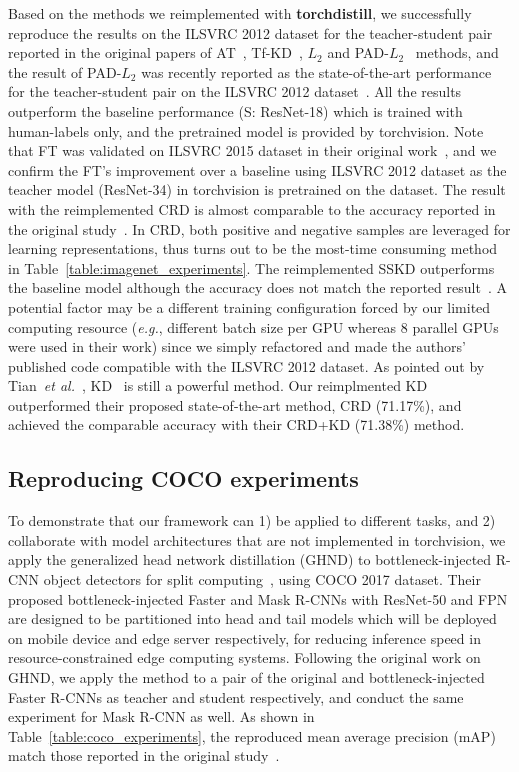 \documentclass[runningheads]{llncs}
\newcommand{\FRAMEWORK}{{\bf torchdistill}\xspace}
\begin{document}
Based on the methods we reimplemented with \FRAMEWORK, we successfully reproduce the results on the ILSVRC 2012 dataset for the teacher-student pair reported in the original papers of AT~\cite{zagoruyko2017paying}, Tf-KD~\cite{yuan2020revisiting}, $L_2$ and PAD-$L_2$~\cite{zhang2020prime} methods, and the result of PAD-$L_2$ was recently reported as the state-of-the-art performance for the teacher-student pair on the ILSVRC 2012 dataset~\cite{zhang2020prime}.
All the results outperform the baseline performance (S: ResNet-18) which is trained with human-labels only, and the pretrained model is provided by torchvision.
Note that FT was validated on ILSVRC 2015 dataset in their original work~\cite{kim2018paraphrasing}, and we confirm the FT's improvement over a baseline using ILSVRC 2012 dataset as the teacher model (ResNet-34) in torchvision is pretrained on the dataset.
The result with the reimplemented CRD is almost comparable to the accuracy reported in the original study~\cite{tian2020contrastive}.
In CRD, both positive and negative samples are leveraged for learning representations, thus turns out to be the most-time consuming method in Table~\ref{table:imagenet_experiments}.
The reimplemented SSKD outperforms the baseline model although the accuracy does not match the reported result~\cite{xu2020knowledge}.
A potential factor may be a different training configuration forced by our limited computing resource (\emph{e.g.}, different batch size per GPU whereas 8 parallel GPUs were used in their work) since we simply refactored and made the authors' published code compatible with the ILSVRC 2012 dataset.
As pointed out by Tian~\emph{et al.}~\cite{tian2020contrastive}, KD~\cite{hinton14distilling} is still a powerful method.
Our reimplmented KD outperformed their proposed state-of-the-art method, CRD (71.17\%), and achieved the comparable accuracy with their CRD+KD (71.38\%) method.


\subsection{Reproducing COCO experiments}
\label{subsec:coco_experiments}
To demonstrate that our framework can 1) be applied to different tasks, and 2) collaborate with model architectures that are not implemented in torchvision, we apply the generalized head network distillation (GHND) to bottleneck-injected R-CNN object detectors for split computing~\cite{matsubara2020neural}, using COCO 2017 dataset.
Their proposed bottleneck-injected Faster and Mask R-CNNs with ResNet-50 and FPN are designed to be partitioned into head and tail models which will be deployed on mobile device and edge server respectively, for reducing inference speed in resource-constrained edge computing systems.
Following the original work on GHND, we apply the method to a pair of the original and bottleneck-injected Faster R-CNNs as teacher and student respectively, and conduct the same experiment for Mask R-CNN as well.
As shown in Table~\ref{table:coco_experiments}, the reproduced mean average precision (mAP) match those reported in the original study~\cite{matsubara2020neural}.
\end{document}
